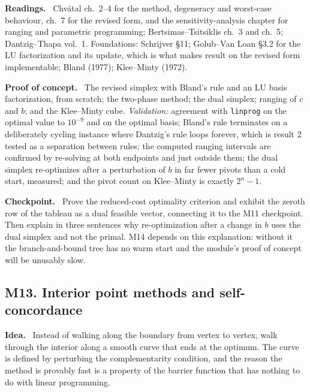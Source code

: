 \documentclass[11pt,a4paper]{article}
\newcommand{\mpart}[1]{\smallskip\noindent\textbf{#1}\ \ignorespaces}
\begin{document}
\mpart{Readings.} Chv\'atal ch.~2--4 for the method, degeneracy and worst-case behaviour,
ch.~7 for the revised form, and the sensitivity-analysis chapter for ranging and parametric
programming; Bertsimas--Tsitsiklis ch.~3 and ch.~5;
Dantzig--Thapa vol.~1. Foundations: Schrijver \S 11; Golub--Van Loan \S 3.2 for the LU
factorization and its update, which is what makes result on the revised form implementable;
Bland (1977); Klee--Minty (1972).

\mpart{Proof of concept.} The revised simplex with Bland's rule and an LU basis factorization,
from scratch; the two-phase method; the dual simplex; ranging of $c$ and $b$; and the
Klee--Minty cube. \emph{Validation:} agreement with \texttt{linprog} on the optimal value to
$10^{-9}$ and on the optimal basis; Bland's rule terminates on a deliberately cycling instance
where Dantzig's rule loops forever, which is result 2 tested as a separation between rules;
the computed ranging intervals are confirmed by re-solving at both endpoints and just outside
them; the dual simplex re-optimizes after a perturbation of $b$ in far fewer pivots than a cold
start, measured; and the pivot count on Klee--Minty is exactly $2^n-1$.

\mpart{Checkpoint.} Prove the reduced-cost optimality criterion and exhibit the zeroth row of
the tableau as a dual feasible vector, connecting it to the M11 checkpoint. Then explain in
three sentences why re-optimization after a change in $b$ uses the dual simplex and not the
primal. M14 depends on this explanation: without it the branch-and-bound tree has no warm
start and the module's proof of concept will be unusably slow.

\clearpage

\subsection{M13. Interior point methods and self-concordance}

\mpart{Idea.} Instead of walking along the boundary from vertex to vertex, walk through the
interior along a smooth curve that ends at the optimum. The curve is defined by perturbing the
complementarity condition, and the reason the method is provably fast is a property of the
barrier function that has nothing to do with linear programming.
\end{document}
